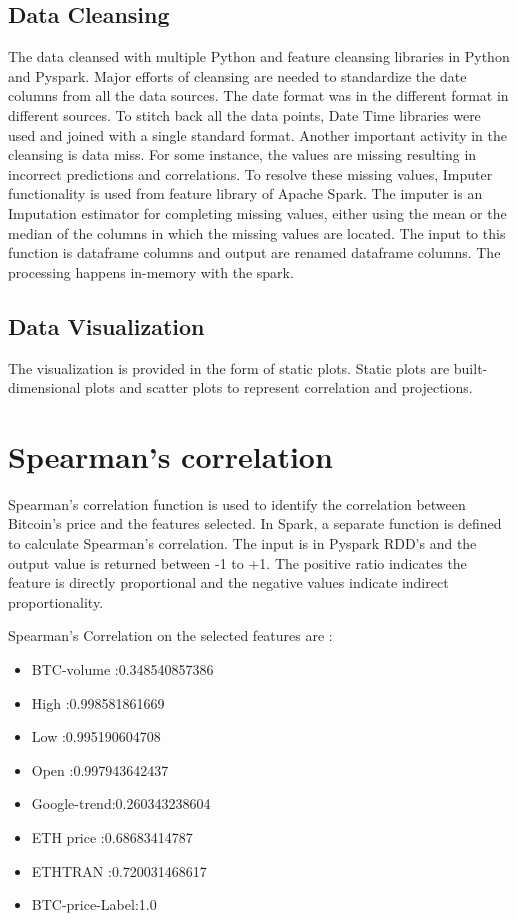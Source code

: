 \documentclass[sigconf]{acmart}
\begin{document}
\subsection{Data Cleansing}
The data cleansed with multiple Python and feature cleansing libraries in Python and Pyspark. Major efforts of cleansing are needed to standardize the date columns from all the data sources. The date format was in the different format in different sources. To stitch back all the data points, Date Time libraries were used and joined with a single standard format. Another important activity in the cleansing is data miss. For some instance, the values are missing resulting in incorrect predictions and correlations. To resolve these missing values, Imputer \cite{imputer:online} functionality is used from feature library of Apache Spark. The imputer is an Imputation estimator for completing missing values, either using the mean or the median of the columns in which the missing values are located. The input to this function is dataframe columns and output are renamed dataframe columns. The processing happens in-memory with the spark.

\subsection{Data Visualization}
The visualization is provided in the form of static plots. Static plots are built-dimensional plots and scatter plots to represent correlation and projections.

\section{Spearman's correlation}
Spearman's correlation function is used to identify the correlation between Bitcoin's price and the features selected. In Spark, a separate function is defined to calculate Spearman's correlation. The input is in Pyspark RDD's and the output value is returned between -1 to +1. The positive ratio indicates the feature is directly proportional and the negative values indicate indirect proportionality.

Spearman's Correlation on the selected features are :

\begin{itemize}
\item BTC-volume    :0.348540857386 
\item High        :0.998581861669 
\item Low         :0.995190604708 
\item Open        :0.997943642437  
\item Google-trend:0.260343238604  
\item ETH price   :0.68683414787  
\item ETHTRAN     :0.720031468617
\item BTC-price-Label:1.0 
\end{itemize}
\end{document}
